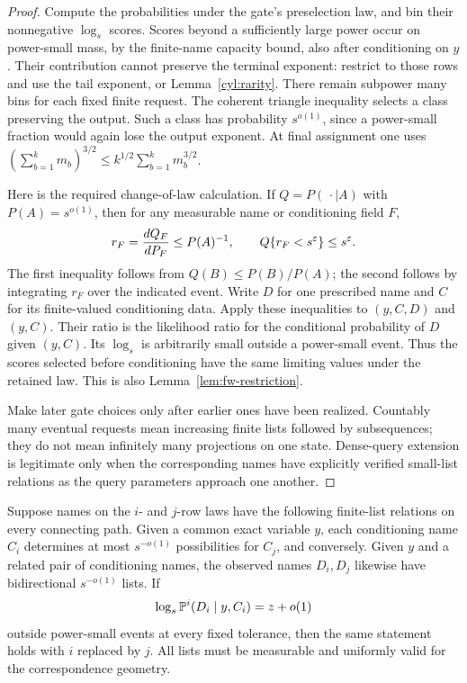 \begin{proof}
Compute the probabilities under the gate's preselection law, and bin
their nonnegative $\log_s$ scores.  Scores beyond a sufficiently large
power occur on power-small mass, by the finite-name capacity bound,
also after conditioning on $y$.  Their contribution cannot preserve
the terminal exponent: restrict to those rows and use the tail exponent,
or Lemma~\ref{cyl:rarity}.  There remain subpower many bins for each
fixed finite request.  The coherent triangle inequality selects a
class preserving the output.  Such a class has probability $s^{o(1)}$,
since a power-small fraction would again lose the output exponent.
At final assignment one uses
$(\sum_{b=1}^k m_b)^{3/2}\le k^{1/2}\sum_{b=1}^k m_b^{3/2}$.

Here is the required change-of-law calculation.  If $Q=P(\,\cdot\mid A)$
with $P(A)=s^{o(1)}$, then for any measurable name or conditioning field
$F$,
\[
 r_F=\frac{dQ_F}{dP_F}\le P(A)^{-1},\qquad
 Q\{r_F<s^\varepsilon\}\le s^\varepsilon.
\]
The first inequality follows from $Q(B)\le P(B)/P(A)$; the second
follows by integrating $r_F$ over the indicated event. Write $D$ for one
prescribed name and $C$ for its finite-valued conditioning data. Apply
these inequalities to $(y,C,D)$ and $(y,C)$. Their ratio is the likelihood
ratio for the conditional probability of $D$ given $(y,C)$.
Its $\log_s$ is arbitrarily small outside a power-small event.
Thus the scores selected before conditioning have the same limiting
values under the retained law.  This is also
Lemma~\ref{lem:fw-restriction}.

Make later gate choices only after earlier ones have been realized.
Countably many eventual requests mean increasing finite lists followed
by subsequences; they do not mean infinitely many projections on one
state.  Dense-query extension is legitimate only when the corresponding
names have explicitly verified small-list relations as the query
parameters approach one another.
\end{proof}

\begin{lemma}\label{cyl:profile-transfer}
Suppose names on the $i$- and $j$-row laws have the following finite-list
relations on every connecting path.  Given a common exact variable $y$,
each conditioning name $C_i$ determines at most $s^{-o(1)}$ possibilities
for $C_j$, and conversely.  Given $y$ and a related pair of conditioning
names, the observed names $D_i,D_j$ likewise have bidirectional
$s^{-o(1)}$ lists.  If
\[
 \log_s\mathbb P^i(D_i\mid y,C_i)=z+o(1)
\]
outside power-small events at every fixed tolerance, then the same
statement holds with $i$ replaced by $j$.  All lists must be measurable
and uniformly valid for the correspondence geometry.
\end{lemma}

